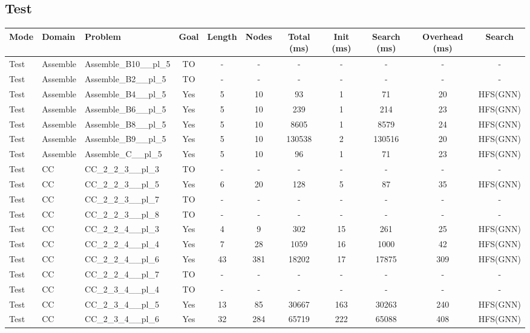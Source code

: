 \documentclass{article}
\begin{document}
\subsection*{Test}
\begin{tabular}{lllcccccccc}
\toprule
Mode & Domain & Problem & Goal & Length & Nodes & Total (ms) & Init (ms) & Search (ms) & Overhead (ms) & Search \\
\midrule
Test & Assemble & Assemble\_B10\_\_pl\_5 & TO & - & - & - & - & - & - & - \\
Test & Assemble & Assemble\_B2\_\_pl\_5 & TO & - & - & - & - & - & - & - \\
Test & Assemble & Assemble\_B4\_\_pl\_5 & Yes & 5 & 10 & 93 & 1 & 71 & 20 & HFS(GNN) \\
Test & Assemble & Assemble\_B6\_\_pl\_5 & Yes & 5 & 10 & 239 & 1 & 214 & 23 & HFS(GNN) \\
Test & Assemble & Assemble\_B8\_\_pl\_5 & Yes & 5 & 10 & 8605 & 1 & 8579 & 24 & HFS(GNN) \\
Test & Assemble & Assemble\_B9\_\_pl\_5 & Yes & 5 & 10 & 130538 & 2 & 130516 & 20 & HFS(GNN) \\
Test & Assemble & Assemble\_C\_\_pl\_5 & Yes & 5 & 10 & 96 & 1 & 71 & 23 & HFS(GNN) \\
Test & CC & CC\_2\_2\_3\_\_pl\_3 & TO & - & - & - & - & - & - & - \\
Test & CC & CC\_2\_2\_3\_\_pl\_5 & Yes & 6 & 20 & 128 & 5 & 87 & 35 & HFS(GNN) \\
Test & CC & CC\_2\_2\_3\_\_pl\_7 & TO & - & - & - & - & - & - & - \\
Test & CC & CC\_2\_2\_3\_\_pl\_8 & TO & - & - & - & - & - & - & - \\
Test & CC & CC\_2\_2\_4\_\_pl\_3 & Yes & 4 & 9 & 302 & 15 & 261 & 25 & HFS(GNN) \\
Test & CC & CC\_2\_2\_4\_\_pl\_4 & Yes & 7 & 28 & 1059 & 16 & 1000 & 42 & HFS(GNN) \\
Test & CC & CC\_2\_2\_4\_\_pl\_6 & Yes & 43 & 381 & 18202 & 17 & 17875 & 309 & HFS(GNN) \\
Test & CC & CC\_2\_2\_4\_\_pl\_7 & TO & - & - & - & - & - & - & - \\
Test & CC & CC\_2\_3\_4\_\_pl\_4 & TO & - & - & - & - & - & - & - \\
Test & CC & CC\_2\_3\_4\_\_pl\_5 & Yes & 13 & 85 & 30667 & 163 & 30263 & 240 & HFS(GNN) \\
Test & CC & CC\_2\_3\_4\_\_pl\_6 & Yes & 32 & 284 & 65719 & 222 & 65088 & 408 & HFS(GNN) \\

\end{tabular}
\end{document}
